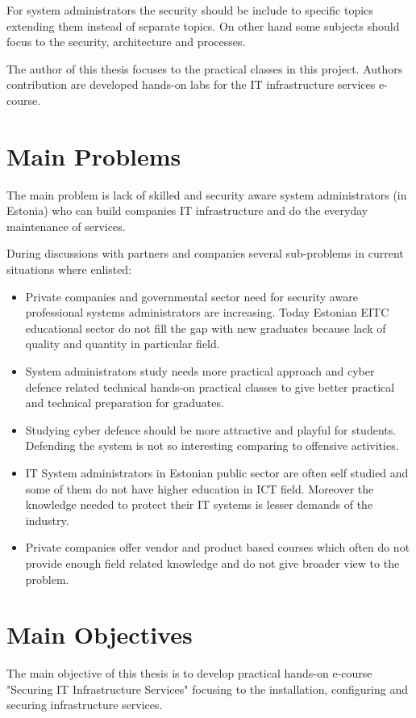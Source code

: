 For system administrators the security should be include to specific topics extending them instead of separate topics. On other hand some subjects should focus to the security, architecture and processes.

The author of this thesis focuses to the practical classes in this project. Authors contribution are developed hands-on labs for the IT infrastructure services e-course.

\section{Main Problems}
The main problem is lack of skilled and security aware system administrators (in Estonia) who can build companies IT infrastructure and do the everyday maintenance of services.

During discussions with partners and companies several sub-problems in current situations where enlisted:
\begin{itemize}
\item Private companies and governmental sector need for security aware professional systems administrators are increasing. Today Estonian \gls{EITC} educational sector do not fill the gap with new graduates because lack of quality and quantity in particular field. 
\item System administrators study needs more practical approach and cyber defence related technical hands-on practical classes to give better practical and technical preparation for graduates.
\item Studying cyber defence should be more attractive and playful for students. Defending the system is not so interesting comparing to offensive activities.
\item IT System administrators in Estonian public sector are often self studied  and some of them do not have higher education in \gls{ICT} field. Moreover the knowledge needed to protect their IT systems is lesser demands of the industry.
\item Private companies offer vendor and product based courses which often do not provide enough field related knowledge and do not give broader view to the problem.
\end{itemize}

\section{Main Objectives}

The main objective of this thesis is to develop practical hands-on e-course "Securing IT Infrastructure Services" focusing to the installation, configuring and securing infrastructure services.


